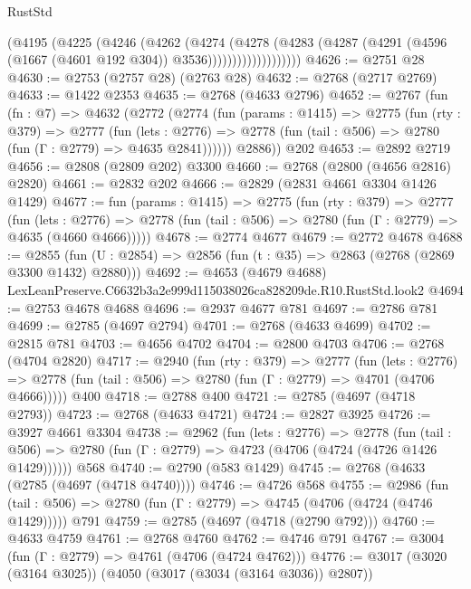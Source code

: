 \begin{lexlean}{RustStd}
\begin{coremodule}
                      (@4195
                        (@4225
                          (@4246
                            (@4262
                              (@4274
                                (@4278
                                  (@4283
                                    (@4287
                                      (@4291
                                        (@4596 (@1667 (@4601 @192 @304)) @3536)))))))))))))))))))
@4626 := @2751 @28
@4630 := @2753 (@2757 @28) (@2763 @28)
@4632 := @2768 (@2717 @2769)
@4633 := @1422 @2353
@4635 := @2768 (@4633 @2796)
@4652 := @2767
    (fun (fn : @7) =>
    @4632
      (@2772
        (@2774
          (fun (params : @1415) =>
          @2775
            (fun (rty : @379) =>
            @2777
              (fun (lets : @2776) =>
              @2778 (fun (tail : @506) => @2780 (fun (Γ : @2779) => @4635 @2841))))))
        @2886))
    @202
@4653 := @2892 @2719
@4656 := @2808 (@2809 @202) @3300
@4660 := @2768 (@2800 (@4656 @2816) @2820)
@4661 := @2832 @202
@4666 := @2829 (@2831 @4661 @3304 @1426 @1429)
@4677 := fun (params : @1415) =>
  @2775
    (fun (rty : @379) =>
    @2777
      (fun (lets : @2776) =>
      @2778 (fun (tail : @506) => @2780 (fun (Γ : @2779) => @4635 (@4660 @4666)))))
@4678 := @2774 @4677
@4679 := @2772 @4678
@4688 := @2855 (fun (U : @2854) => @2856 (fun (t : @35) => @2863 (@2768 (@2869 @3300 @1432) @2880)))
@4692 := @4653 (@4679 @4688) LexLeanPreserve.C6632b3a2e999d115038026ca828209de.R10.RustStd.look2
@4694 := @2753 @4678 @4688
@4696 := @2937 @4677 @781
@4697 := @2786 @781
@4699 := @2785 (@4697 @2794)
@4701 := @2768 (@4633 @4699)
@4702 := @2815 @781
@4703 := @4656 @4702
@4704 := @2800 @4703
@4706 := @2768 (@4704 @2820)
@4717 := @2940
    (fun (rty : @379) =>
    @2777
      (fun (lets : @2776) =>
      @2778 (fun (tail : @506) => @2780 (fun (Γ : @2779) => @4701 (@4706 @4666)))))
    @400
@4718 := @2788 @400
@4721 := @2785 (@4697 (@4718 @2793))
@4723 := @2768 (@4633 @4721)
@4724 := @2827 @3925
@4726 := @3927 @4661 @3304
@4738 := @2962
    (fun (lets : @2776) =>
    @2778
      (fun (tail : @506) => @2780 (fun (Γ : @2779) => @4723 (@4706 (@4724 (@4726 @1426 @1429))))))
    @568
@4740 := @2790 (@583 @1429)
@4745 := @2768 (@4633 (@2785 (@4697 (@4718 @4740))))
@4746 := @4726 @568
@4755 := @2986
    (fun (tail : @506) => @2780 (fun (Γ : @2779) => @4745 (@4706 (@4724 (@4746 @1429)))))
    @791
@4759 := @2785 (@4697 (@4718 (@2790 @792)))
@4760 := @4633 @4759
@4761 := @2768 @4760
@4762 := @4746 @791
@4767 := @3004 (fun (Γ : @2779) => @4761 (@4706 (@4724 @4762)))
@4776 := @3017 (@3020 (@3164 @3025)) (@4050 (@3017 (@3034 (@3164 @3036)) @2807))

\end{coremodule}
\end{lexlean}
